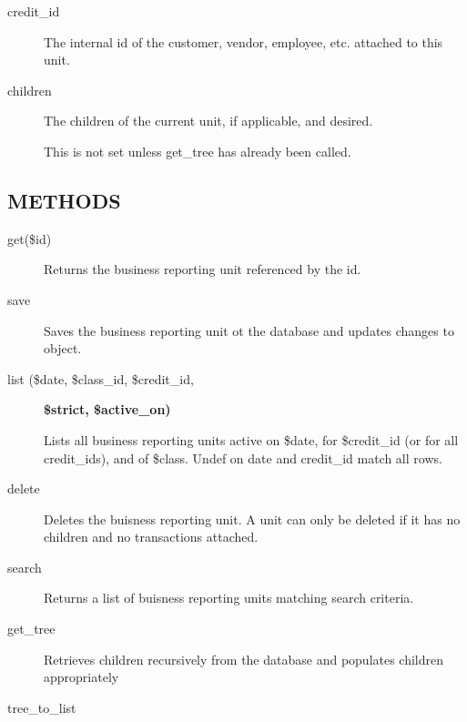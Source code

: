 \begin{description}
\begin{description}
\item[{credit\_id}] \mbox{}

The internal id of the customer, vendor, employee, etc. attached to this 
unit.


\item[{children}] \mbox{}

The children of the current unit, if applicable, and desired.



This is not set unless get\_tree has already been called.

\end{description}
\subsection*{METHODS\label{LedgerSMB::DBObject::Business_Unit_Class_METHODS}}
\begin{description}

\item[{get(\$id)}] \mbox{}

Returns the business reporting unit referenced by the id.


\item[{save}] \mbox{}

Saves the business reporting unit ot the database and updates changes to object.


\item[{list (\$date, \$class\_id, \$credit\_id,}] \textbf{\$strict, \$active\_on)}

Lists all business reporting units active on \$date, for \$credit\_id (or for all
credit\_ids), and of \$class.  Undef on date and credit\_id match all rows.


\item[{delete}] \mbox{}

Deletes the buisness reporting unit.  A unit can only be deleted if it has no 
children and no transactions attached.


\item[{search}] \mbox{}

Returns a list of buisness reporting units matching search criteria.


\item[{get\_tree}] \mbox{}

Retrieves children recursively from the database and populates children 
appropriately


\item[{tree\_to\_list}] \mbox{}


\end{description}
\end{description}
